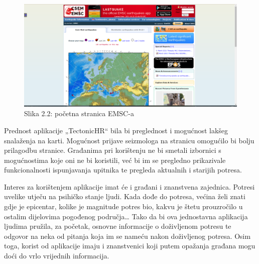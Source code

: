 \begin{figure}[H]
			\includegraphics[width=\textwidth]{slike/emsc1.PNG} %
			\caption{Slika 2.2: početna stranica EMSC-a}
			\label{fig:promjene2} %
		\end{figure}

{Prednost aplikacije „TectonicHR“ bila bi preglednost i mogućnost lakšeg snalaženja na karti. 
Mogućnost prijave seizmologa na stranicu omogućilo bi bolju prilagodbu stranice. Građanima pri korištenju ne bi smetali izbornici s mogućnostima koje oni ne bi koristili, već bi im se pregledno prikazivale funkcionalnosti ispunjavanja upitnika te pregleda aktualnih i starijih potresa. }

{Interes za korištenjem aplikacije imat će i građani i znanstvena zajednica. Potresi uvelike utječu na psihičko stanje ljudi. 
Kada dođe do potresa, većina želi znati gdje je epicentar, kolike je magnitude potres bio, kakvu je štetu prouzročilo u ostalim dijelovima pogođenog područja… 
Tako da bi ova jednostavna aplikacija ljudima pružila, za početak, osnovne informacije o doživljenom potresu te odgovor na neka od pitanja koja im se nameću nakon doživljenog potresa. 
Osim toga, korist od aplikacije imaju i znanstvenici koji putem opažanja građana mogu doći do vrlo vrijednih informacija. }\\		
		
\eject
		
	